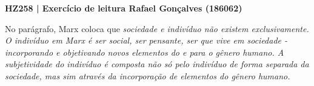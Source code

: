 \documentclass[12pt]{article}
\begin{document}
\noindent
\large\textbf{HZ258 | Exercício de leitura \hfill Rafael Gonçalves (186062)}
\break\hfill

No parágrafo, Marx coloca que \em sociedade \em e \em indivíduo \em não existem exclusivamente.
O indivíduo em Marx é ser social, ser pensante, ser que vive em sociedade - incorporando e  objetivando novos elementos do e para o gênero humano.
A subjetividade do indivíduo é composta não só pelo indivíduo de forma separada da sociedade, mas sim através da incorporação de elementos do gênero humano.
\end{document}
